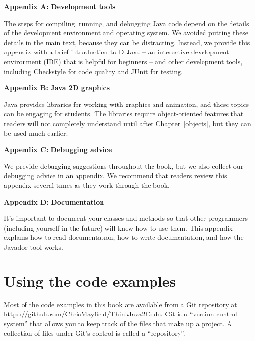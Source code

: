 \begin{description}

\item{\bf Appendix A: Development tools}

The steps for compiling, running, and debugging Java code depend on the details of the development environment and operating system.
We avoided putting these details in the main text, because they can be distracting.
Instead, we provide this appendix with a brief introduction to DrJava -- an interactive development environment (IDE) that is helpful for beginners -- and other development tools, including Checkstyle for code quality and JUnit for testing.

\item{\bf Appendix B: Java 2D graphics}

Java provides libraries for working with graphics and animation, and these topics can be engaging for students.
The libraries require object-oriented features that readers will not completely understand until after Chapter~\ref{objects}, but they can be used much earlier.

\item{\bf Appendix C: Debugging advice}

We provide debugging suggestions throughout the book, but we also collect our debugging advice in an appendix.
We recommend that readers review this appendix several times as they work through the book.

\item{\bf Appendix D: Documentation}

It's important to document your classes and methods so that other programmers (including yourself in the future) will know how to use them.
This appendix explains how to read documentation, how to write documentation, and how the Javadoc tool works.

\end{description}


\section*{Using the code examples}
\label{code}

Most of the code examples in this book are available from a Git repository at \url{https://github.com/ChrisMayfield/ThinkJava2Code}.
Git is a ``version control system'' that allows you to keep track of the files that make up a project.
A collection of files under Git's control is called a ``repository''.

